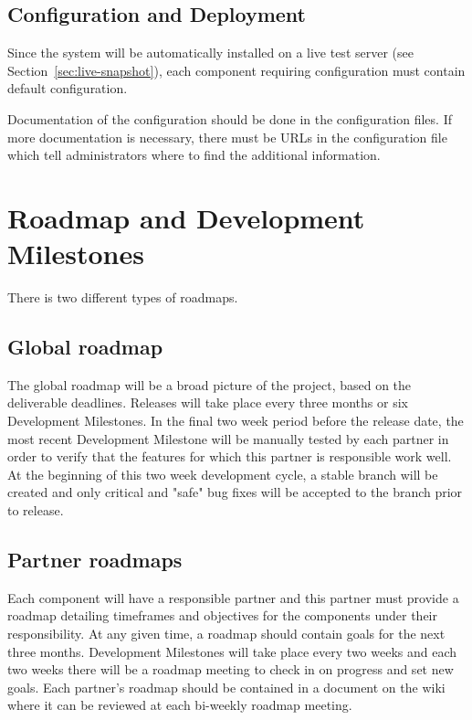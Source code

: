 \subsection{Configuration and Deployment}
\label{sec:deployment-process}

Since the system will be automatically installed on a live test server
(see Section~\ref{sec:live-snapshot}), each component requiring configuration must contain
default configuration.

Documentation of the configuration should be done in the configuration files. If more
documentation is necessary, there must be URLs in the configuration file which tell
administrators where to find the additional information.

\section{Roadmap and Development Milestones}
\label{sec:roadmap}

There is two different types of roadmaps.

\subsection{Global roadmap}
\label{sec:global-roadmap}

The global roadmap will be a broad picture of the project, based on the deliverable
deadlines. Releases will take place every three months or six Development Milestones.
In the final two week period before the release date, the most recent Development
Milestone will be manually tested by each partner in order to verify that the
features for which this partner is responsible work well. At the beginning of this
two week development cycle, a stable branch will be created and only critical and
"safe" bug fixes will be accepted to the branch prior to release.

\subsection{Partner roadmaps}
\label{sec:partner-roadmaps}

Each component will have a responsible partner and this partner must provide a roadmap
detailing timeframes and objectives for the components under their responsibility. At any
given time, a roadmap should contain goals for the next three months.
Development Milestones will take place every two weeks and each two weeks there will be
a roadmap meeting to check in on progress and set new goals. Each partner's roadmap
should be contained in a document on the wiki where it can be reviewed at each bi-weekly
roadmap meeting.

